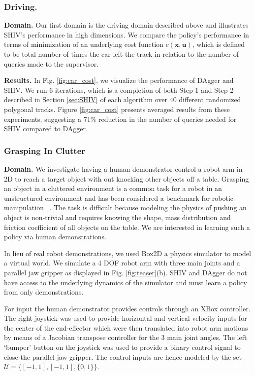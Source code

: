 \documentclass[10pt, conference]{ieeeconf}      %
\newcommand{\bu}{\mathbf{u}}
\newcommand{\bx}{\mathbf{x}}
\begin{document}
\subsubsection{Driving.}

\noindent\textbf{Domain.} Our first domain is the driving domain described above and illustrates SHIV's performance in high dimensions. 
We compare the policy's performance in terms of minimization of an underlying cost function $c(\bx,\bu)$, which is
defined to be total number of times the car left the track in relation to the number of queries made to the supervisor.

\noindent\textbf{Results.} 
In Fig. \ref{fig:car_cost}, we visualize the performance of DAgger and SHIV.  We run 6 iterations, which is a completion of both Step 1 and Step 2 described in Section \ref{sec:SHIV} of each algorithm over 40 different
randomized polygonal tracks. Figure \ref{fig:car_cost} presents averaged
results from these experiments, suggesting a $71\%$ reduction in the number of queries needed for SHIV compared to DAgger. 
 


\subsubsection{Grasping In Clutter}

\noindent\textbf{Domain.}
We investigate having a human demonstrator control a robot arm in 2D to reach a target object with out knocking other objects off a table. Grasping an object in a cluttered environment is a common task for a robot in an unstructured environment and has been considered a benchmark for robotic manipulation~ \cite{kitaevphysics,kingnonprehensile}. The task is difficult because modeling the physics of pushing an object is non-trivial and requires knowing the shape, mass distribution and friction coefficient of all objects on the table. We are interested in learning such a policy via human demonstrations. 

In lieu of real robot demonstrations, we used Box2D a physics simulator to model a virtual world. We simulate a 4 DOF robot arm with three main joints and a parallel jaw gripper as
displayed in Fig. \ref{fig:teaser}(b). SHIV and DAgger do not have access to the underlying dynamics of the simulator and must learn a policy from only demonstrations. 

For input the human demonstrator provides controls through an XBox controller. The right joystick was used to
    provide horizontal and vertical velocity inputs for the center of the end-effector which were then translated into
robot arm motions by means of a Jacobian transpose controller for the 3 main joint angles. The left `bumper' button on the joystick was used to provide a binary control signal to close the parallel jaw
gripper. The control inputs are hence modeled by the set $\mathcal{U} = \lbrace [-1,1],[-1,1],\lbrace 0,1 \rbrace \rbrace$.  
\end{document}
